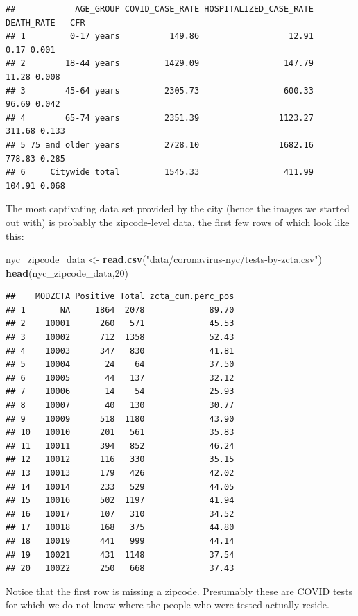 \documentclass[openany]{book}
\newenvironment{Shaded}{\begin{snugshade}}{\end{snugshade}}
\newcommand{\DecValTok}[1]{\textcolor[rgb]{0.00,0.00,0.81}{#1}}
\newcommand{\KeywordTok}[1]{\textcolor[rgb]{0.13,0.29,0.53}{\textbf{#1}}}
\newcommand{\NormalTok}[1]{#1}
\newcommand{\StringTok}[1]{\textcolor[rgb]{0.31,0.60,0.02}{#1}}
\begin{document}
\begin{verbatim}
##            AGE_GROUP COVID_CASE_RATE HOSPITALIZED_CASE_RATE DEATH_RATE   CFR
## 1         0-17 years          149.86                  12.91       0.17 0.001
## 2        18-44 years         1429.09                 147.79      11.28 0.008
## 3        45-64 years         2305.73                 600.33      96.69 0.042
## 4        65-74 years         2351.39                1123.27     311.68 0.133
## 5 75 and older years         2728.10                1682.16     778.83 0.285
## 6     Citywide total         1545.33                 411.99     104.91 0.068
\end{verbatim}

The most captivating data set provided by the city (hence the images we started out with) is probably the zipcode-level data, the first few rows of which look like this:

\begin{Shaded}
\begin{Highlighting}[]
\NormalTok{nyc_zipcode_data <-}\StringTok{ }\KeywordTok{read.csv}\NormalTok{(}\StringTok{"data/coronavirus-nyc/tests-by-zcta.csv"}\NormalTok{)}
\KeywordTok{head}\NormalTok{(nyc_zipcode_data,}\DecValTok{20}\NormalTok{)}
\end{Highlighting}
\end{Shaded}

\begin{verbatim}
##    MODZCTA Positive Total zcta_cum.perc_pos
## 1       NA     1864  2078             89.70
## 2    10001      260   571             45.53
## 3    10002      712  1358             52.43
## 4    10003      347   830             41.81
## 5    10004       24    64             37.50
## 6    10005       44   137             32.12
## 7    10006       14    54             25.93
## 8    10007       40   130             30.77
## 9    10009      518  1180             43.90
## 10   10010      201   561             35.83
## 11   10011      394   852             46.24
## 12   10012      116   330             35.15
## 13   10013      179   426             42.02
## 14   10014      233   529             44.05
## 15   10016      502  1197             41.94
## 16   10017      107   310             34.52
## 17   10018      168   375             44.80
## 18   10019      441   999             44.14
## 19   10021      431  1148             37.54
## 20   10022      250   668             37.43
\end{verbatim}

Notice that the first row is missing a zipcode. Presumably these are COVID tests for which we do not know where the people who were tested actually reside.
\end{document}
